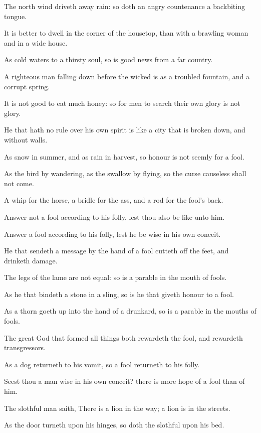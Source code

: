 \Verse The north wind driveth away rain: so doth an angry countenance a backbiting tongue.

\Verse It is better to dwell in the corner of the housetop, than with a brawling woman and in a wide house.

\Verse As cold waters to a thirsty soul, so is good news from a far country.

\Verse A righteous man falling down before the wicked is as a troubled fountain, and a corrupt spring.

\Verse It is not good to eat much honey: so for men to search their own glory is not glory.

\Verse He that hath no rule over his own spirit is like a city that is broken down, and without walls.


\Chapter
\Verse As snow in summer, and as rain in harvest, so honour is not seemly for a fool.

\Verse As the bird by wandering, as the swallow by flying, so the curse causeless shall not come.

\Verse A whip for the horse, a bridle for the ass, and a rod for the fool's back.

\Verse Answer not a fool according to his folly, lest thou also be like unto him.

\Verse Answer a fool according to his folly, lest he be wise in his own conceit.

\Verse He that sendeth a message by the hand of a fool cutteth off the feet, and drinketh damage.

\Verse The legs of the lame are not equal: so is a parable in the mouth of fools.

\Verse As he that bindeth a stone in a sling, so is he that giveth honour to a fool.

\Verse As a thorn goeth up into the hand of a drunkard, so is a parable in the mouths of fools.

\Verse The great God that formed all things both rewardeth the fool, and rewardeth transgressors.

\Verse As a dog returneth to his vomit, so a fool returneth to his folly.

\Verse Seest thou a man wise in his own conceit? there is more hope of a fool than of him.

\Verse The slothful man saith, There is a lion in the way; a lion is in the streets.

\Verse As the door turneth upon his hinges, so doth the slothful upon his bed.

